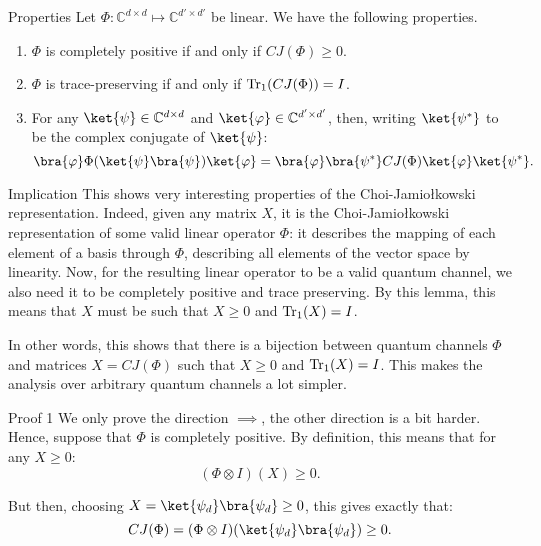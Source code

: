 \documentclass[a4paper]{article}
\begin{document}
\begin{parag}{Properties}
    Let $\Phi: \mathbb{C}^{d \times d} \mapsto \mathbb{C}^{d' \times d'}$ be linear. We have the following properties.
    \begin{enumerate}
        \item $\Phi$ is completely positive if and only if $CJ\left(\Phi\right) \geq 0$.
        \item $\Phi$ is trace-preserving if and only if $\Tr_1\left(CJ\left(\Phi\right)\right) = I$.
        \item For any $\ket{\psi} \in \mathbb{C}^{d \times d}$ and $\ket{\phi} \in \mathbb{C}^{d' \times d'}$, then, writing $\ket{\psi^*}$ to be the complex conjugate of $\ket{\psi}$:
        \[\bra{\phi} \Phi\left(\ket{\psi}\bra{\psi}\right) \ket{\phi} = \bra{\phi} \bra{\psi^*} CJ\left(\Phi\right) \ket{\phi} \ket{\psi^*}.\]
    \end{enumerate}

    \begin{subparag}{Implication}
        This shows very interesting properties of the Choi-Jamio{\l}kowski representation. Indeed, given any matrix $X$, it is the Choi-Jamio{\l}kowski representation of some valid linear operator $\Phi$: it describes the mapping of each element of a basis through $\Phi$, describing all elements of the vector space by linearity. Now, for the resulting linear operator to be a valid quantum channel, we also need it to be completely positive and trace preserving. By this lemma, this means that $X$ must be such that $X \geq 0$ and $\Tr_1\left(X\right) = I$.

        In other words, this shows that there is a bijection between quantum channels $\Phi$ and matrices $X = CJ\left(\Phi\right)$ such that $X \geq 0$ and $\Tr_1\left(X\right) = I$. This makes the analysis over arbitrary quantum channels a lot simpler.
    \end{subparag}

    \begin{subparag}{Proof 1}
        We only prove the direction $\implies$, the other direction is a bit harder. Hence, suppose that $\Phi$ is completely positive. By definition, this means that for any $X \geq 0$: 
        \[\left(\Phi \otimes I\right)\left(X\right) \geq 0.\]
        
        But then, choosing $X = \ket{\psi_d}\bra{\psi_d} \geq 0$, this gives exactly that: 
        \[CJ\left(\Phi\right) = \left(\Phi \otimes I\right)\left(\ket{\psi_d}\bra{\psi_d}\right) \geq 0.\]
    \end{subparag}


\end{parag}
\end{document}
